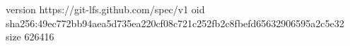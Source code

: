 version https://git-lfs.github.com/spec/v1
oid sha256:49ec772bb94aea5d735ea220cf08c721c252fb2c8fbefd65632906595a2c5e32
size 626416
